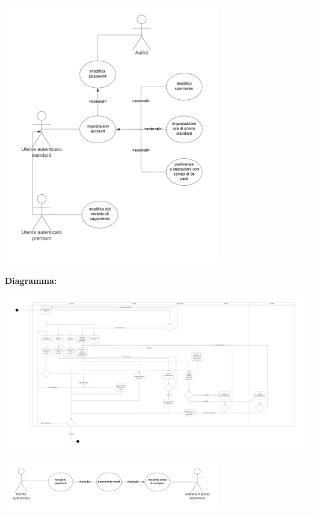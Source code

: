 \begin{listaPersonale}[UC]{}
    \newpage

    \begin{center}
        \includegraphics[width=0.7\textwidth]{img/Diagrammi/UseCases/ImpostazioniAccount.png}
    \end{center}


    \textbf{Diagramma:}
    \begin{center}
        \includegraphics[width=1\textwidth]{img/Diagrammi/DS/DS_ImpostazioneAccount.png}
    \end{center}




    \newpage

    \begin{center}
        \includegraphics[width=0.7\textwidth]{img/Diagrammi/UseCases/RecuperoPassword.png}
    \end{center}



\end{listaPersonale}
